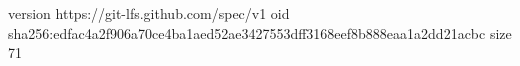 version https://git-lfs.github.com/spec/v1
oid sha256:edfac4a2f906a70ce4ba1aed52ae3427553dff3168eef8b888eaa1a2dd21acbc
size 71
